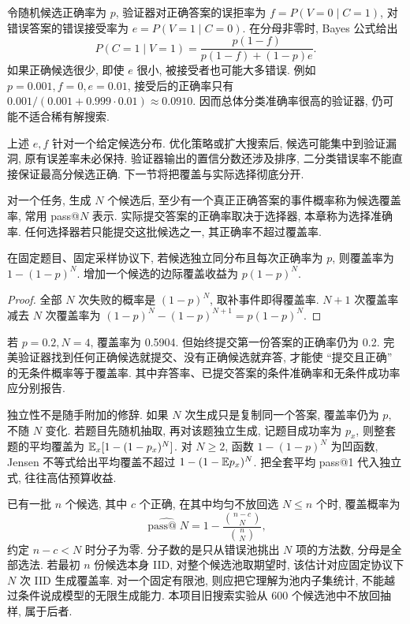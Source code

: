 令随机候选正确率为 $p$, 验证器对正确答案的误拒率为 $f=P(V=0\mid C=1)$, 对错误答案的错误接受率为 $e=P(V=1\mid C=0)$. 在分母非零时, Bayes 公式给出
\[
P(C=1\mid V=1)=\frac{p(1-f)}{p(1-f)+(1-p)e}.
\]
如果正确候选很少, 即使 $e$ 很小, 被接受者也可能大多错误. 例如 $p=0.001,f=0,e=0.01$, 接受后的正确率只有 $0.001/(0.001+0.999\cdot0.01)\approx0.0910$. 因而总体分类准确率很高的验证器, 仍可能不适合稀有解搜索.

上述 $e,f$ 针对一个给定候选分布. 优化策略或扩大搜索后, 候选可能集中到验证漏洞, 原有误差率未必保持. 验证器输出的置信分数还涉及排序, 二分类错误率不能直接保证最高分候选正确. 下一节将把覆盖与实际选择彻底分开.

\label{sec:reason-pass}
\begin{definition}
对一个任务, 生成 $N$ 个候选后, 至少有一个真正正确答案的事件概率称为候选覆盖率, 常用 pass@$N$ 表示. 实际提交答案的正确率取决于选择器, 本章称为选择准确率. 任何选择器若只能提交这批候选之一, 其正确率不超过覆盖率.
\end{definition}
\begin{proposition}
在固定题目、固定采样协议下, 若候选独立同分布且每次正确率为 $p$, 则覆盖率为 $1-(1-p)^N$. 增加一个候选的边际覆盖收益为 $p(1-p)^N$.
\end{proposition}
\begin{proof}
全部 $N$ 次失败的概率是 $(1-p)^N$, 取补事件即得覆盖率. $N+1$ 次覆盖率减去 $N$ 次覆盖率为 $(1-p)^N-(1-p)^{N+1}=p(1-p)^N$.
\end{proof}
若 $p=0.2,N=4$, 覆盖率为 0.5904. 但始终提交第一份答案的正确率仍为 0.2. 完美验证器找到任何正确候选就提交、没有正确候选就弃答, 才能使 ``提交且正确'' 的无条件概率等于覆盖率. 其中弃答率、已提交答案的条件准确率和无条件成功率应分别报告.

独立性不是随手附加的修辞. 如果 $N$ 次生成只是复制同一个答案, 覆盖率仍为 $p$, 不随 $N$ 变化. 若题目先随机抽取, 再对该题独立生成, 记题目成功率为 $p_x$, 则整套题的平均覆盖为 $\mathbb E_x[1-(1-p_x)^N]$. 对 $N\ge2$, 函数 $1-(1-p)^N$ 为凹函数, Jensen 不等式给出平均覆盖不超过 $1-(1-\mathbb E p_x)^N$. 把全套平均 pass@1 代入独立式, 往往高估预算收益.

已有一批 $n$ 个候选, 其中 $c$ 个正确, 在其中均匀不放回选 $N\le n$ 个时, 覆盖概率为
\[
\widehat{\operatorname{pass@}N}
=1-\frac{\binom{n-c}{N}}{\binom nN},
\]
约定 $n-c<N$ 时分子为零. 分子数的是只从错误池挑出 $N$ 项的方法数, 分母是全部选法. 若最初 $n$ 份候选本身 IID, 对整个候选池取期望时, 该估计对应固定协议下 $N$ 次 IID 生成覆盖率. 对一个固定有限池, 则应把它理解为池内子集统计, 不能越过条件说成模型的无限生成能力. 本项目旧搜索实验从 600 个候选池中不放回抽样, 属于后者.

